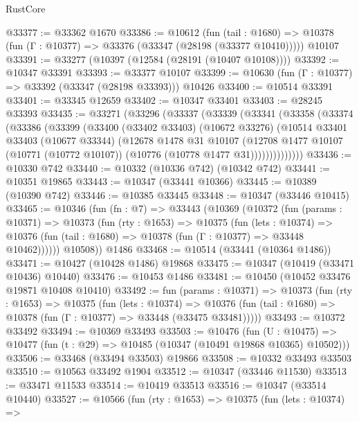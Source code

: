 \begin{lexlean}{RustCore}
\begin{coremodule}
@33377 := @33362 @1670
@33386 := @10612
    (fun (tail : @1680) => @10378 (fun (Γ : @10377) => @33376 (@33347 (@28198 (@33377 @10410)))))
    @10107
@33391 := @33277 (@10397 (@12584 (@28191 (@10407 @10108))))
@33392 := @10347 @33391
@33393 := @33377 @10107
@33399 := @10630 (fun (Γ : @10377) => @33392 (@33347 (@28198 @33393))) @10426
@33400 := @10514 @33391
@33401 := @33345 @12659
@33402 := @10347 @33401
@33403 := @28245 @33393
@33435 := @33271
    (@33296
      (@33337
        (@33339
          (@33341
            (@33358
              (@33374
                (@33386
                  (@33399
                    (@33400
                      (@33402 @33403)
                      (@10672 @33276)
                      (@10514
                        @33401
                        @33403
                        (@10677 @33344)
                        (@12678
                          @1478
                          @31
                          @10107
                          (@12708
                            @1477
                            @10107
                            (@10771 (@10772 @10107))
                            (@10776 (@10778 @1477 @31))))))))))))))
@33436 := @10330 @742
@33440 := @10332 (@10336 @742) (@10342 @742)
@33441 := @10351 @19865
@33443 := @10347 (@33441 @10366)
@33445 := @10389 (@10390 @742)
@33446 := @10385 @33445
@33448 := @10347 (@33446 @10415)
@33465 := @10346
    (fun (fn : @7) =>
    @33443
      (@10369
        (@10372
          (fun (params : @10371) =>
          @10373
            (fun (rty : @1653) =>
            @10375
              (fun (lets : @10374) =>
              @10376 (fun (tail : @1680) => @10378 (fun (Γ : @10377) => @33448 @10462))))))
        @10508))
    @1486
@33468 := @10514 (@33441 (@10364 @1486))
@33471 := @10427 (@10428 @1486) @19868
@33475 := @10347 (@10419 (@33471 @10436) @10440)
@33476 := @10453 @1486
@33481 := @10450 (@10452 @33476 @19871 @10408 @10410)
@33492 := fun (params : @10371) =>
  @10373
    (fun (rty : @1653) =>
    @10375
      (fun (lets : @10374) =>
      @10376 (fun (tail : @1680) => @10378 (fun (Γ : @10377) => @33448 (@33475 @33481)))))
@33493 := @10372 @33492
@33494 := @10369 @33493
@33503 := @10476
    (fun (U : @10475) => @10477 (fun (t : @29) => @10485 (@10347 (@10491 @19868 @10365) @10502)))
@33506 := @33468 (@33494 @33503) @19866
@33508 := @10332 @33493 @33503
@33510 := @10563 @33492 @1904
@33512 := @10347 (@33446 @11530)
@33513 := @33471 @11533
@33514 := @10419 @33513
@33516 := @10347 (@33514 @10440)
@33527 := @10566
    (fun (rty : @1653) =>
    @10375
      (fun (lets : @10374) =>

\end{coremodule}
\end{lexlean}
